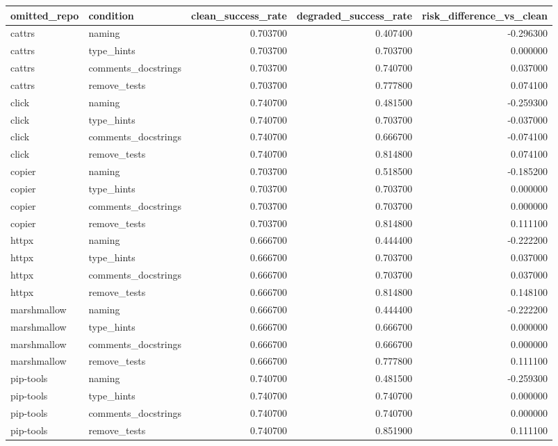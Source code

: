 \begin{tabular}{llrrr}
\toprule
omitted\_repo & condition & clean\_success\_rate & degraded\_success\_rate & risk\_difference\_vs\_clean \\
\midrule
cattrs & naming & 0.703700 & 0.407400 & -0.296300 \\
cattrs & type\_hints & 0.703700 & 0.703700 & 0.000000 \\
cattrs & comments\_docstrings & 0.703700 & 0.740700 & 0.037000 \\
cattrs & remove\_tests & 0.703700 & 0.777800 & 0.074100 \\
click & naming & 0.740700 & 0.481500 & -0.259300 \\
click & type\_hints & 0.740700 & 0.703700 & -0.037000 \\
click & comments\_docstrings & 0.740700 & 0.666700 & -0.074100 \\
click & remove\_tests & 0.740700 & 0.814800 & 0.074100 \\
copier & naming & 0.703700 & 0.518500 & -0.185200 \\
copier & type\_hints & 0.703700 & 0.703700 & 0.000000 \\
copier & comments\_docstrings & 0.703700 & 0.703700 & 0.000000 \\
copier & remove\_tests & 0.703700 & 0.814800 & 0.111100 \\
httpx & naming & 0.666700 & 0.444400 & -0.222200 \\
httpx & type\_hints & 0.666700 & 0.703700 & 0.037000 \\
httpx & comments\_docstrings & 0.666700 & 0.703700 & 0.037000 \\
httpx & remove\_tests & 0.666700 & 0.814800 & 0.148100 \\
marshmallow & naming & 0.666700 & 0.444400 & -0.222200 \\
marshmallow & type\_hints & 0.666700 & 0.666700 & 0.000000 \\
marshmallow & comments\_docstrings & 0.666700 & 0.666700 & 0.000000 \\
marshmallow & remove\_tests & 0.666700 & 0.777800 & 0.111100 \\
pip-tools & naming & 0.740700 & 0.481500 & -0.259300 \\
pip-tools & type\_hints & 0.740700 & 0.740700 & 0.000000 \\
pip-tools & comments\_docstrings & 0.740700 & 0.740700 & 0.000000 \\
pip-tools & remove\_tests & 0.740700 & 0.851900 & 0.111100 \\

\end{tabular}
